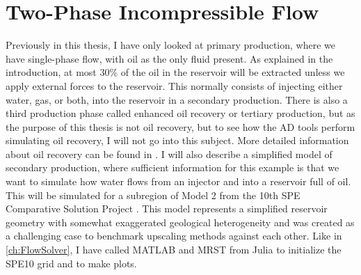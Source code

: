 \section{Two-Phase Incompressible Flow}
\label{sec:TwoPhaseSimulation}
Previously in this thesis, I have only looked at primary production, where we have single-phase flow, with oil as the only fluid present. As explained in the introduction, at most 30\% of the oil in the reservoir will be extracted unless we apply external forces to the reservoir. This normally consists of injecting either water, gas, or both, into the reservoir in a secondary production. There is also a third production phase called enhanced oil recovery or tertiary production, but as the purpose of this thesis is not oil recovery, but to see how the AD tools perform simulating oil recovery, I will not go into this subject. More detailed information about oil recovery can be found in \citet{lieMrstUrl}. I will also describe a simplified model of secondary production, where sufficient information for this example is that we want to simulate how water flows from an injector and into a reservoir full of oil. This will be simulated for a subregion of Model 2 from the 10th SPE Comparative Solution Project \emph{\citep{SPE10}}. This model represents a simplified reservoir geometry with somewhat exaggerated geological heterogeneity and was created as a challenging case to benchmark upscaling methods against each other. Like in \autoref{ch:FlowSolver}, I have called MATLAB and MRST from Julia to initialize the SPE10 grid and to make plots.

